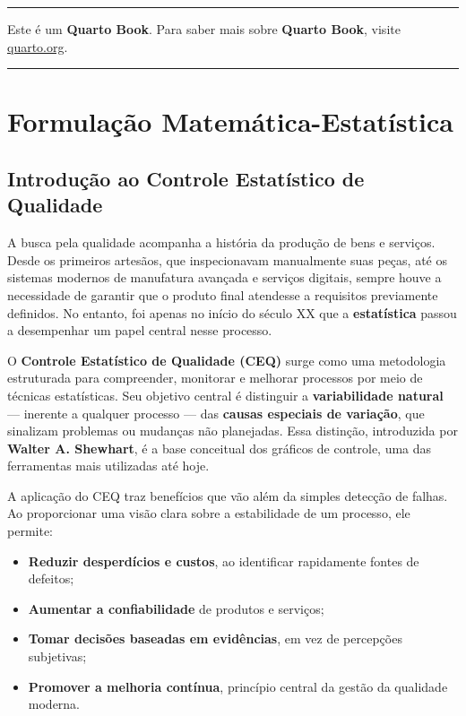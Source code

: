 \documentclass[
  portuguese,
  11pt,
  a4paper,
  DIV=11,
  numbers=noendperiod]{scrreprt}
\providecommand{\tightlist}{%
  \setlength{\itemsep}{0pt}\setlength{\parskip}{0pt}}
\begin{document}
\begin{center}\rule{0.5\linewidth}{0.5pt}\end{center}

Este é um \textbf{Quarto Book}. Para saber mais sobre \textbf{Quarto
Book}, visite \href{https://quarto.org/docs/books/}{quarto.org}.

\begin{center}\rule{0.5\linewidth}{0.5pt}\end{center}

\part{Formulação Matemática-Estatística}


\chapter{Introdução ao Controle Estatístico de
Qualidade}\label{introduuxe7uxe3o-ao-controle-estatuxedstico-de-qualidade}

A busca pela qualidade acompanha a história da produção de bens e
serviços. Desde os primeiros artesãos, que inspecionavam manualmente
suas peças, até os sistemas modernos de manufatura avançada e serviços
digitais, sempre houve a necessidade de garantir que o produto final
atendesse a requisitos previamente definidos. No entanto, foi apenas no
início do século XX que a \textbf{estatística} passou a desempenhar um
papel central nesse processo.

O \textbf{Controle Estatístico de Qualidade (CEQ)} surge como uma
metodologia estruturada para compreender, monitorar e melhorar processos
por meio de técnicas estatísticas. Seu objetivo central é distinguir a
\textbf{variabilidade natural} --- inerente a qualquer processo --- das
\textbf{causas especiais de variação}, que sinalizam problemas ou
mudanças não planejadas. Essa distinção, introduzida por \textbf{Walter
A. Shewhart}, é a base conceitual dos gráficos de controle, uma das
ferramentas mais utilizadas até hoje.

A aplicação do CEQ traz benefícios que vão além da simples detecção de
falhas. Ao proporcionar uma visão clara sobre a estabilidade de um
processo, ele permite:

\begin{itemize}
\tightlist
\item
  \textbf{Reduzir desperdícios e custos}, ao identificar rapidamente
  fontes de defeitos;
\item
  \textbf{Aumentar a confiabilidade} de produtos e serviços;
\item
  \textbf{Tomar decisões baseadas em evidências}, em vez de percepções
  subjetivas;
\item
  \textbf{Promover a melhoria contínua}, princípio central da gestão da
  qualidade moderna.
\end{itemize}
\end{document}
